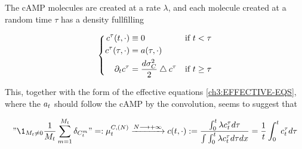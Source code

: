The cAMP molecules are created at a rate $\lambda$, and each molecule created at a random time $\tau$ has a density fullfilling

\begin{equation*}
	\left\{
\begin{aligned}
	c^\tau(t, \cdot) 
	& \equiv 0
	&&\text{if } t < \tau
	\\
	c^\tau(\tau, \cdot) 
	&= a(\tau, \cdot)
	&&
	\\
	\partial_t c^\tau
	&= \frac{d\sigma_C^2}{2} \bigtriangleup c^\tau
	&&\text{if } t \geq \tau
\end{aligned}
\right.
\end{equation*}

This, together with the form of the effective equations \ref{ch3:EFFECTIVE-EQS}, where the $a_t$ should follow the cAMP by the convolution, seems to suggest that

\begin{equation*}
	"\1_{\hmactive_t \neq 0} \frac{1}{\hmactive_t}\sum_{m=1}^{\hmactive_t} \delta_{\camp_t^m} " =: \empmeas_t^{\camp,(N)} 
	\xrightarrow{N\longrightarrow +\infty} 
		\cdens(t,\cdot) :=
		\frac{
			\int_0^t \lambda \cdens_t^\tau 	d \tau
		}{
		\int
			\int_0^t \lambda \cdens_t^\tau 	d \tau
		dx
		}
		=
		\frac{1}{t}
		\int_0^t 
			\cdens_t^\tau 
		d \tau
\end{equation*}

